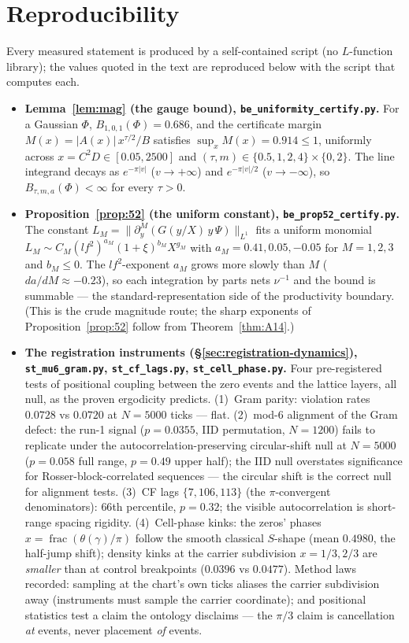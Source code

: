 \documentclass[11pt]{article}
\theoremstyle{definition}
\begin{document}
\section{Reproducibility}\label{app:repro}

Every measured statement is produced by a self-contained script (no $L$-function library); the values
quoted in the text are reproduced below with the script that computes each.

\begin{itemize}\setlength\itemsep{0.6\baselineskip}
\item \textbf{Lemma~\ref{lem:mag} (the gauge bound), \texttt{be\_uniformity\_certify.py}.} For a
Gaussian $\Phi$, $B_{1,0,1}(\Phi)=0.686$, and the certificate margin
$M(x)=|A(x)|\,x^{\tau/2}/B$ satisfies $\sup_x M(x)=0.914\le1$, uniformly across $x=C^2D\in[0.05,2500]$
and $(\tau,m)\in\{0.5,1,2,4\}\times\{0,2\}$. The line integrand decays as $e^{-\pi|v|}$ ($v\to+\infty$)
and $e^{-\pi|v|/2}$ ($v\to-\infty$), so $B_{\tau,m,a}(\Phi)<\infty$ for every $\tau>0$.

\item \textbf{Proposition~\ref{prop:52} (the uniform constant), \texttt{be\_prop52\_certify.py}.} The
constant $L_M=\|\partial_y^M(G(y/X)\,y\,\Psi)\|_{L^1}$ fits a uniform monomial
$L_M\sim C_M(lf^2)^{a_M}(1+\xi)^{b_M}X^{g_M}$ with $a_M=0.41,0.05,-0.05$ for $M=1,2,3$ and $b_M\le0$.
The $lf^2$-exponent $a_M$ grows more slowly than $M$ ($da/dM\approx-0.23$), so each integration by
parts nets $\nu^{-1}$ and the bound is summable --- the standard-representation side of the
productivity boundary. (This is the crude magnitude route; the sharp exponents of
Proposition~\ref{prop:52} follow from Theorem~\ref{thm:A14}.)

\item \textbf{The registration instruments (\S\ref{sec:registration-dynamics}),
\texttt{st\_mu6\_gram.py}, \texttt{st\_cf\_lags.py}, \texttt{st\_cell\_phase.py}.} Four
pre-registered tests of positional coupling between the zero events and the lattice layers, all
null, as the proven ergodicity predicts. (1)~Gram parity: violation rates $0.0728$ vs $0.0720$ at
$N{=}5000$ ticks --- flat. (2)~mod-$6$ alignment of the Gram defect: the run-1 signal ($p=0.0355$,
IID permutation, $N{=}1200$) fails to replicate under the autocorrelation-preserving
circular-shift null at $N{=}5000$ ($p=0.058$ full range, $p=0.49$ upper half); the IID null
overstates significance for Rosser-block-correlated sequences --- the circular shift is the
correct null for alignment tests. (3)~CF lags $\{7,106,113\}$ (the $\pi$-convergent
denominators): $66$th percentile, $p=0.32$; the visible autocorrelation is short-range spacing
rigidity. (4)~Cell-phase kinks: the zeros' phases $x=\operatorname{frac}(\theta(\gamma)/\pi)$
follow the smooth classical $S$-shape (mean $0.4980$, the half-jump shift); density kinks at the
carrier subdivision $x=1/3,2/3$ are \emph{smaller} than at control breakpoints ($0.0396$ vs
$0.0477$). Method laws recorded: sampling at the chart's own ticks aliases the carrier
subdivision away (instruments must sample the carrier coordinate); and positional statistics test
a claim the ontology disclaims --- the $\pi/3$ claim is cancellation \emph{at} events, never
placement \emph{of} events.


\end{itemize}
\end{document}
